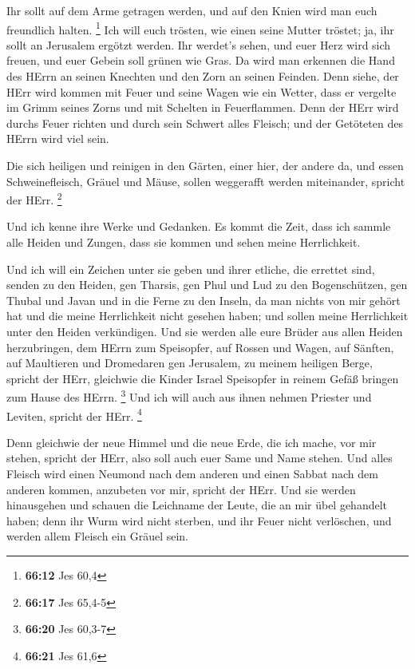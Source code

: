 Ihr sollt auf dem Arme getragen werden, und auf den Knien wird man euch
freundlich halten. \footnote{\textbf{66:12} Jes 60,4}  Ich
will euch trösten, wie einen seine Mutter tröstet; ja, ihr sollt an
Jerusalem ergötzt werden.  Ihr werdet's sehen, und euer
Herz wird sich freuen, und euer Gebein soll grünen wie Gras. Da wird man
erkennen die Hand des HErrn an seinen Knechten und den Zorn an seinen
Feinden.  Denn siehe, der HErr wird kommen mit Feuer und
seine Wagen wie ein Wetter, dass er vergelte im Grimm seines Zorns und
mit Schelten in Feuerflammen.  Denn der HErr wird durchs
Feuer richten und durch sein Schwert alles Fleisch; und der Getöteten
des HErrn wird viel sein.

 Die sich heiligen und reinigen in den Gärten, einer hier,
der andere da, und essen Schweinefleisch, Gräuel und Mäuse, sollen
weggerafft werden miteinander, spricht der HErr. \footnote{\textbf{66:17}
  Jes 65,4-5}

 Und ich kenne ihre Werke und Gedanken. Es kommt die Zeit,
dass ich sammle alle Heiden und Zungen, dass sie kommen und sehen meine
Herrlichkeit.

 Und ich will ein Zeichen unter sie geben und ihrer
etliche, die errettet sind, senden zu den Heiden, gen Tharsis, gen Phul
und Lud zu den Bogenschützen, gen Thubal und Javan und in die Ferne zu
den Inseln, da man nichts von mir gehört hat und die meine Herrlichkeit
nicht gesehen haben; und sollen meine Herrlichkeit unter den Heiden
verkündigen.  Und sie werden alle eure Brüder aus allen
Heiden herzubringen, dem HErrn zum Speisopfer, auf Rossen und Wagen, auf
Sänften, auf Maultieren und Dromedaren gen Jerusalem, zu meinem heiligen
Berge, spricht der HErr, gleichwie die Kinder Israel Speisopfer in
reinem Gefäß bringen zum Hause des HErrn. \footnote{\textbf{66:20} Jes
  60,3-7}  Und ich will auch aus ihnen nehmen Priester und
Leviten, spricht der HErr. \footnote{\textbf{66:21} Jes 61,6}

 Denn gleichwie der neue Himmel und die neue Erde, die ich
mache, vor mir stehen, spricht der HErr, also soll auch euer Same und
Name stehen.  Und alles Fleisch wird einen Neumond nach dem
anderen und einen Sabbat nach dem anderen kommen, anzubeten vor mir,
spricht der HErr.  Und sie werden hinausgehen und schauen
die Leichname der Leute, die an mir übel gehandelt haben; denn ihr Wurm
wird nicht sterben, und ihr Feuer nicht verlöschen, und werden allem
Fleisch ein Gräuel sein.
